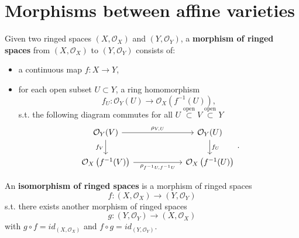 \section{Morphisms between affine varieties}
\begin{defn}
	Given two ringed spaces $\left(X, \mathcal{O}_X\right)$ and $\left(Y, \mathcal{O}_Y\right)$, a \textbf{morphism of ringed spaces} from  $\left( X, \mathcal{O}_{ X } \right)$ to $\left( Y, \mathcal{O}_{ Y } \right)$ consists of:
	\begin{itemize}
		\item a continuous map $f: X \to Y$, 
		\item for each open subset $U \subset Y$, a ring homomorphism
			\begin{equation}
				f_U: \mathcal{O}_Y(U) \to \mathcal{O}_X \left( f^{-1}(U) \right)
			,\end{equation} 
			s.t. the following diagram commutes for all $U \stackrel{\text{open}}{\subset}  V \stackrel{\text{open}}{\subset} Y$
			\begin{equation}
			\begin{tikzcd}
				\mathcal{O}_Y(V) \arrow[rr, "\rho_{V,U}", rightarrow] \arrow[d, "f_V"', rightarrow] & \ & \mathcal{O}_Y(U) \arrow[d, "f_U", rightarrow] \\
				\mathcal{O}_X \left( f^{-1}(V) \right) \arrow[rr, "\rho_{f^{-1}U, f^{-1}U}"', rightarrow] & \ & \mathcal{O}_X \left( f^{-1}(U) \right)
			\end{tikzcd}
			.\end{equation} 
	\end{itemize}
\end{defn}

\begin{defn}
	An \textbf{isomorphism of ringed spaces} is a morphism of ringed spaces
	\begin{equation}
	f: \left( X, \mathcal{O}_{ X } \right) \to \left( Y, \mathcal{O}_{ Y } \right)
	\end{equation} 
	s.t. there exists another morphism of ringed spaces
	\begin{equation}
	g: \left( Y, \mathcal{O}_{ Y } \right) \to \left( X, \mathcal{O}_{ X } \right)
	\end{equation} 
	with $g \circ f = id_{\left( X, \mathcal{O}_{ X } \right)}$ and $f \circ g = id_{\left( Y, \mathcal{O}_{ Y } \right)}$.
\end{defn}

